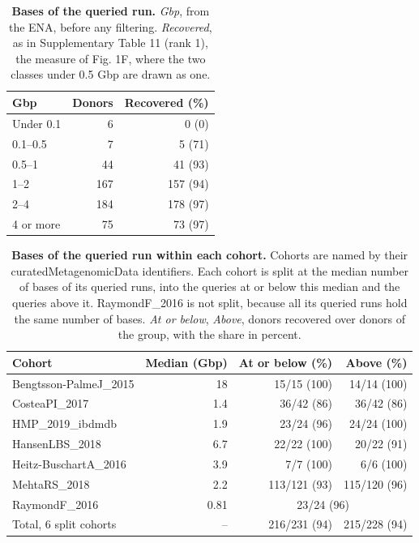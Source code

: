 \documentclass[11pt,a4paper]{article}
\begin{document}
\setcounter{table}{12}
\begin{table}[!htbp]\centering\small
\caption[Bases of the queried run]{\textbf{Bases of the queried run.} \textit{Gbp}, from the ENA, before any filtering. \textit{Recovered}, as in Supplementary Table 11 (rank 1), the measure of Fig. 1F, where the two classes under 0.5 Gbp are drawn as one.}
\begin{tabular}{lrr}
\toprule
Gbp & Donors & Recovered (\%) \\
\midrule
Under 0.1 & 6 & 0 (0) \\
0.1--0.5 & 7 & 5 (71) \\
0.5--1 & 44 & 41 (93) \\
1--2 & 167 & 157 (94) \\
2--4 & 184 & 178 (97) \\
4 or more & 75 & 73 (97) \\
\bottomrule
\end{tabular}
\end{table}

\setcounter{table}{13}
\begin{table}[!htbp]\centering\small
\caption[Bases of the queried run within each cohort]{\textbf{Bases of the queried run within each cohort.} Cohorts are named by their curatedMetagenomicData identifiers. Each cohort is split at the median number of bases of its queried runs, into the queries at or below this median and the queries above it. RaymondF\_2016 is not split, because all its queried runs hold the same number of bases. \textit{At or below}, \textit{Above}, donors recovered over donors of the group, with the share in percent.}
\begin{tabular}{lrrr}
\toprule
Cohort & Median (Gbp) & At or below (\%)& Above (\%) \\
\midrule
Bengtsson-PalmeJ\_2015 & 18 & 15/15 (100) & 14/14 (100) \\
CosteaPI\_2017 & 1.4 & 36/42 (86) & 36/42 (86) \\
HMP\_2019\_ibdmdb & 1.9 & 23/24 (96) & 24/24 (100) \\
HansenLBS\_2018 & 6.7 & 22/22 (100) & 20/22 (91) \\
Heitz-BuschartA\_2016 & 3.9 & 7/7 (100) & 6/6 (100) \\
MehtaRS\_2018 & 2.2 & 113/121 (93) & 115/120 (96) \\
RaymondF\_2016 & 0.81 & \multicolumn{2}{c}{23/24 (96)} \\
\midrule
Total, 6 split cohorts & -- & 216/231 (94) & 215/228 (94) \\
\bottomrule
\end{tabular}
\end{table}
\end{document}
